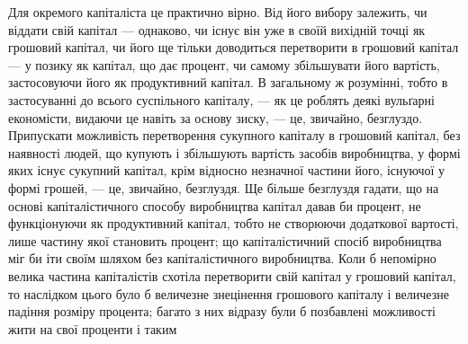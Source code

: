 Для окремого капіталіста це практично вірно. Від його вибору
залежить, чи віддати свій капітал — однаково, чи існує
він уже в своїй вихідній точці як грошовий капітал, чи його
ще тільки доводиться перетворити в грошовий капітал — у позику
як капітал, що дає процент, чи самому збільшувати його
вартість, застосовуючи його як продуктивний капітал. В загальному
ж розумінні, тобто в застосуванні до всього суспільного
капіталу, — як це роблять деякі вульґарні економісти, видаючи
це навіть за основу зиску, — це, звичайно, безглуздо. Припускати
можливість перетворення сукупного капіталу в грошовий капітал,
без наявності людей, що купують і збільшують вартість
засобів виробництва, у формі яких існує сукупний капітал, крім
відносно незначної частини його, існуючої у формі грошей, — це,
звичайно, безглуздя. Ще більше безглуздя гадати, що на основі
капіталістичного способу виробництва капітал давав би процент,
не функціонуючи як продуктивний капітал, тобто не створюючи
додаткової вартості, лише частину якої становить процент; що
капіталістичний спосіб виробництва міг би іти своїм шляхом без
капіталістичного виробництва. Коли б непомірно велика частина
капіталістів схотіла перетворити свій капітал у грошовий капітал,
то наслідком цього було б величезне знецінення грошового капіталу
і величезне падіння розміру процента; багато з них відразу
були б позбавлені можливості жити на свої проценти і таким
\parbreak{}  %
